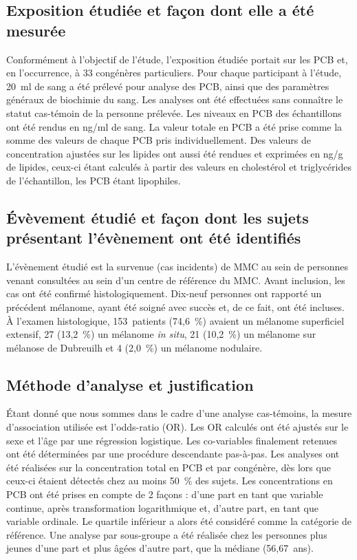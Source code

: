 \documentclass[10pt]{article}
\begin{document}
\subsection{Exposition étudiée et façon dont elle a été mesurée}
Conformément à l'objectif de l'étude, l'exposition étudiée portait sur les PCB et, en l'occurrence, à 33 congénères particuliers. Pour chaque participant à l'étude, 20~ml de sang a été prélevé pour analyse des PCB, ainsi que des paramètres généraux de biochimie du sang. Les analyses ont été effectuées sans connaître le statut cas-témoin de la personne prélevée. Les niveaux en PCB des échantillons ont été rendus en ng/ml de sang. La valeur totale en PCB a été prise comme la somme des valeurs de chaque PCB pris individuellement. Des valeurs de concentration ajustées sur les lipides ont aussi été rendues et exprimées en ng/g de lipides, ceux-ci étant calculés à partir des valeurs en cholestérol et triglycérides de l'échantillon, les PCB étant lipophiles.

\subsection{\'{E}vèvement étudié et façon dont les sujets présentant l'évènement ont été identifiés}
L'évènement étudié est la survenue (cas incidents) de MMC au sein de personnes venant consultées au sein d'un centre de référence du MMC. Avant inclusion, les cas ont été confirmé histologiquement. Dix-neuf personnes ont rapporté un précédent mélanome, ayant été soigné avec succès et, de ce fait, ont été incluses. \`{A} l'examen histologique, 153~patients (74,6~\%) avaient un mélanome superficiel extensif, 27 (13,2~\%) un mélanome \emph{in situ}, 21 (10,2~\%) un mélanome sur mélanose de Dubreuilh et 4 (2,0~\%) un mélanome nodulaire.  

\subsection{Méthode d'analyse et justification}
\'{E}tant donné que nous sommes dans le cadre d'une analyse cas-témoins, la mesure d'association utilisée est l'odds-ratio (OR). Les OR calculés ont été ajustés sur le sexe et l'âge par une régression logistique. Les co-variables finalement retenues ont été déterminées par une procédure descendante pas-à-pas. Les analyses ont été réalisées sur la concentration total en PCB et par congénère, dès lors que ceux-ci étaient détectés chez au moins 50~\% des sujets. Les concentrations en PCB ont été prises en compte de 2 façons : d'une part en tant que variable continue, après transformation logarithmique et, d'autre part, en tant que variable ordinale. Le quartile inférieur a alors été considéré comme la catégorie de référence. Une analyse par sous-groupe a été réalisée chez les personnes plus jeunes d'une part et plus âgées d'autre part, que la médiane (56,67~ans). 
\end{document}
